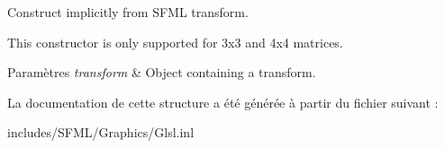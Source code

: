 Construct implicitly from S\+F\+ML transform. 

This constructor is only supported for 3x3 and 4x4 matrices.


\begin{DoxyParams}{Paramètres}
{\em transform} & Object containing a transform. \\
\hline
\end{DoxyParams}


La documentation de cette structure a été générée à partir du fichier suivant \+:\begin{DoxyCompactItemize}
\item 
includes/\+S\+F\+M\+L/\+Graphics/Glsl.\+inl\end{DoxyCompactItemize}
